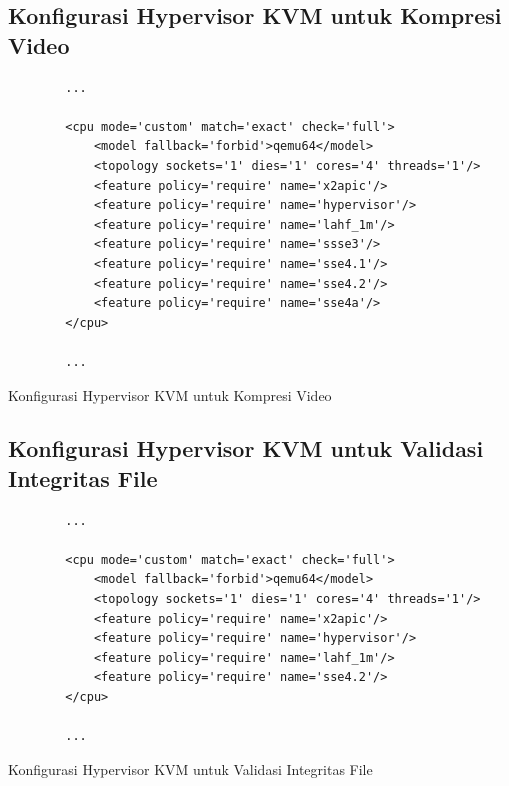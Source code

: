 \subsection{Konfigurasi Hypervisor KVM untuk Kompresi Video}
\begin{listing}[H]
    \begin{verbatim}
        ...

        <cpu mode='custom' match='exact' check='full'>
            <model fallback='forbid'>qemu64</model>
            <topology sockets='1' dies='1' cores='4' threads='1'/>
            <feature policy='require' name='x2apic'/>
            <feature policy='require' name='hypervisor'/> 
            <feature policy='require' name='lahf_1m'/>
            <feature policy='require' name='ssse3'/>
            <feature policy='require' name='sse4.1'/>
            <feature policy='require' name='sse4.2'/>
            <feature policy='require' name='sse4a'/>
        </cpu>
        
        ...
    \end{verbatim}
    \caption{Konfigurasi Hypervisor KVM untuk Kompresi Video}
    \label{code:tuned_kompresi_video}
\end{listing}

\subsection{Konfigurasi Hypervisor KVM untuk Validasi Integritas File}
\begin{listing}[H]
    \begin{verbatim}
        ...

        <cpu mode='custom' match='exact' check='full'>
            <model fallback='forbid'>qemu64</model>
            <topology sockets='1' dies='1' cores='4' threads='1'/>
            <feature policy='require' name='x2apic'/>
            <feature policy='require' name='hypervisor'/> 
            <feature policy='require' name='lahf_1m'/>
            <feature policy='require' name='sse4.2'/>
        </cpu>
        
        ...
    \end{verbatim}
    \caption{Konfigurasi Hypervisor KVM untuk Validasi Integritas File}
    \label{code:tuned_validasi_integritas_file}
\end{listing}

